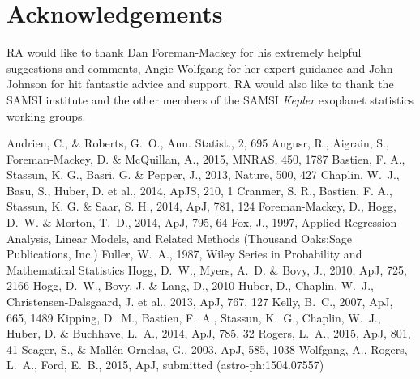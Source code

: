 \documentclass[apjl]{emulateapj}
\begin{document}
\acknowledgements
\section*{Acknowledgements}

RA would like to thank Dan Foreman-Mackey for his extremely helpful suggestions
and comments, Angie Wolfgang for her expert guidance and John Johnson for hit
fantastic advice and support.
RA would also like to thank the SAMSI institute and the other members of the
SAMSI {\it Kepler} exoplanet statistics working groups.


\begin{thebibliography}{99}
Andrieu, C., \& Roberts, G.~O., Ann. Statist., 2, 695
Angusr, R., Aigrain, S., Foreman-Mackey, D. \& McQuillan, A., 2015, MNRAS,
450, 1787
 Bastien,
F. A., Stassun, K. G., Basri, G. \& Pepper, J., 2013, Nature, 500, 427
Chaplin, W.~J., Basu, S., Huber, D. et al., 2014, ApJS, 210, 1
Cranmer, S. R., Bastien, F. A., Stassun, K. G. \& Saar, S. H., 2014, ApJ, 781,
124
 Foreman-Mackey, D., Hogg, D.~W. \& Morton, T.~D., 2014,
ApJ, 795, 64
Fox, J., 1997, Applied Regression Analysis, Linear Models, and Related Methods
(Thousand Oaks:Sage Publications, Inc.)
Fuller, W.~A., 1987, Wiley Series in Probability and Mathematical Statistics
Hogg, D.~W., Myers, A.~D. \& Bovy, J., 2010, ApJ, 725,
2166
Hogg, D.~W., Bovy, J. \& Lang, D., 2010
Huber, D., Chaplin, W.~J., Christensen-Dalsgaard, J. et al., 2013, ApJ, 767,
127
 Kelly, B.~C., 2007,
ApJ, 665, 1489
Kipping, D.~M., Bastien, F.~A., Stassun, K.~G., Chaplin, W.~J., Huber, D. \&
Buchhave, L.~A., 2014, ApJ, 785, 32
Rogers, L.~A., 2015, ApJ, 801, 41
Seager, S., \& Mall\'{e}n-Ornelas, G., 2003, ApJ, 585, 1038
Wolfgang, A., Rogers, L.~A., Ford, E.~B., 2015, ApJ, submitted
(astro-ph:1504.07557)
\end{thebibliography}
\end{document}
